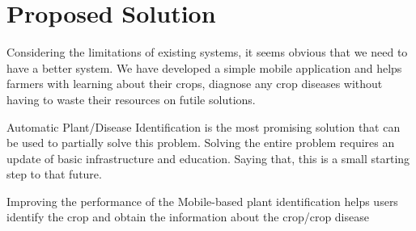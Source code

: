 \documentclass[../Report.tex]{subfiles}
\begin{document}
\section{Proposed Solution}
Considering the limitations of existing systems, it seems obvious that we need to have a better system. We have developed a simple 
mobile application and helps farmers with learning about their crops, diagnose any crop diseases without having to waste their resources
on futile solutions.\par
Automatic Plant/Disease Identification is the most promising solution that can be used to partially solve this problem. Solving the entire
problem requires an update of basic infrastructure and education. Saying that, this is a small starting step to that future.\par
Improving the performance of the Mobile-based plant identification helps users identify the crop and obtain the information about the 
crop/crop disease\par
\end{document}
